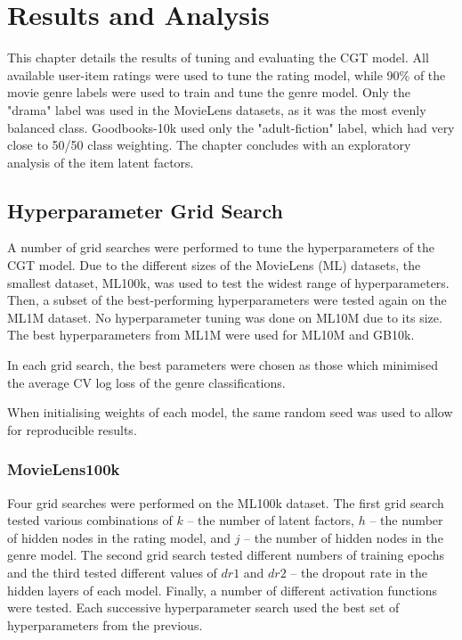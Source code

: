 \chapter{Results and Analysis}
\label{results}

This chapter details the results of tuning and evaluating the CGT model. All available user-item ratings were used to tune the rating model, while 90\% of the movie genre labels were used to train and tune the genre model. Only the "drama" label was used in the MovieLens datasets, as it was the most evenly balanced class. Goodbooks-10k used only the "adult-fiction" label, which had very close to 50/50 class weighting. The chapter concludes with an exploratory analysis of the item latent factors.

\section{Hyperparameter Grid Search}
A number of grid searches were performed to tune the hyperparameters of the CGT model. Due to the different sizes of the MovieLens (ML) datasets, the smallest dataset, ML100k, was used to test the widest range of hyperparameters. Then, a subset of the best-performing hyperparameters were tested again on the ML1M dataset. No hyperparameter tuning was done on ML10M due to its size. The best hyperparameters from ML1M were used for ML10M and GB10k.

In each grid search, the best parameters were chosen as those which minimised the average CV log loss of the genre classifications.

When initialising weights of each model, the same random seed was used to allow for reproducible results.

\subsection{MovieLens100k}
Four grid searches were performed on the ML100k dataset. The first grid search tested various combinations of $k$ -- the number of latent factors, $h$ -- the number of hidden nodes in the rating model, and $j$ -- the number of hidden nodes in the genre model. The second grid search tested different numbers of training epochs and the third tested different values of $dr1$ and $dr2$ -- the dropout rate in the hidden layers of each model. Finally, a number of different activation functions were tested. Each successive hyperparameter search used the best set of hyperparameters from the previous.

